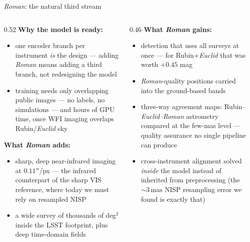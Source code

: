 \documentclass[aspectratio=169,10pt]{beamer}
\newcommand{\mas}{\,\mathrm{mas}}
\begin{document}
\begin{frame}{\textit{Roman}: the natural third stream}
  \begin{columns}[T]
    \begin{column}{0.52\textwidth}
      \textbf{Why the model is ready:}
      \begin{itemize}\small\setlength\itemsep{0.4em}
        \item one encoder branch per instrument \emph{is} the design ---
          adding \textit{Roman} means \alert{adding a third branch}, not redesigning the model
        \item training needs only \alert{overlapping public images} --- no labels, no
          simulations --- and hours of GPU time, once WFI imaging overlaps Rubin/\textit{Euclid} sky
      \end{itemize}
      \vspace{0.4em}
      \textbf{What \textit{Roman} adds:}
      \begin{itemize}\small\setlength\itemsep{0.4em}
        \item \alert{sharp, deep near-infrared imaging at $0.11''$/px} --- the infrared
          counterpart of the sharp VIS reference, where today we must rely on resampled NISP
        \item a wide survey of thousands of deg$^2$ \alert{inside the LSST footprint},
          plus deep time-domain fields
      \end{itemize}
    \end{column}
    \begin{column}{0.46\textwidth}
      \textbf{What \textit{Roman} gains:}
      \begin{itemize}\small\setlength\itemsep{0.4em}
        \item detection that uses all surveys at once --- for Rubin$+$\textit{Euclid}
          that was worth $+0.45$ mag
        \item \textit{Roman}-quality positions carried into the ground-based bands
        \item \alert{three-way agreement maps}: Rubin--\textit{Euclid}--\textit{Roman}
          astrometry compared at the few-mas level --- quality assurance no
          single pipeline can produce
        \item cross-instrument alignment solved \emph{inside} the model instead of inherited
          from preprocessing (the ${\sim}3\mas$ NISP resampling error we found is exactly that)
      \end{itemize}
    \end{column}
  \end{columns}
\end{frame}
\end{document}

